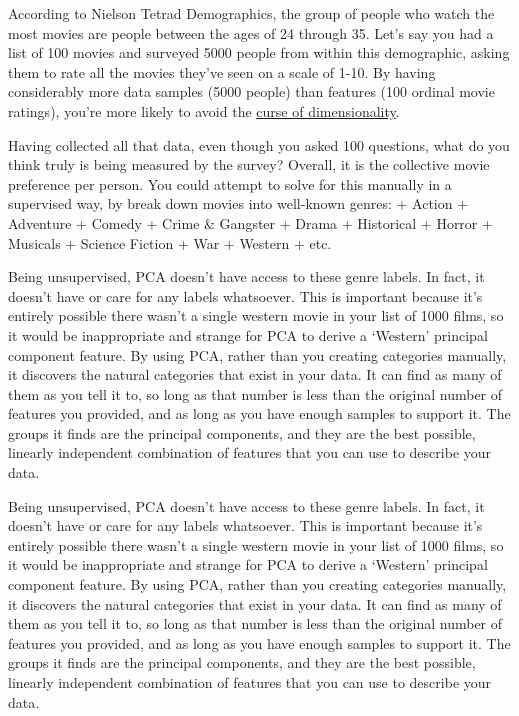 \documentclass[11pt]{article}
\begin{document}
According to Nielson Tetrad Demographics, the group of people who watch
the most movies are people between the ages of 24 through 35. Let's say
you had a list of 100 movies and surveyed 5000 people from within this
demographic, asking them to rate all the movies they've seen on a scale
of 1-10. By having considerably more data samples (5000 people) than
features (100 ordinal movie ratings), you're more likely to avoid the
\href{https://en.wikipedia.org/wiki/Curse_of_dimensionality}{curse of
dimensionality}.

Having collected all that data, even though you asked 100 questions,
what do you think truly is being measured by the survey? Overall, it is
the collective movie preference per person. You could attempt to solve
for this manually in a supervised way, by break down movies into
well-known genres: + Action + Adventure + Comedy + Crime \& Gangster +
Drama + Historical + Horror + Musicals + Science Fiction + War + Western
+ etc.

Being unsupervised, PCA doesn't have access to these genre labels. In
fact, it doesn't have or care for any labels whatsoever. This is
important because it's entirely possible there wasn't a single western
movie in your list of 1000 films, so it would be inappropriate and
strange for PCA to derive a `Western' principal component feature. By
using PCA, rather than you creating categories manually, it discovers
the natural categories that exist in your data. It can find as many of
them as you tell it to, so long as that number is less than the original
number of features you provided, and as long as you have enough samples
to support it. The groups it finds are the principal components, and
they are the best possible, linearly independent combination of features
that you can use to describe your data.

Being unsupervised, PCA doesn't have access to these genre labels. In
fact, it doesn't have or care for any labels whatsoever. This is
important because it's entirely possible there wasn't a single western
movie in your list of 1000 films, so it would be inappropriate and
strange for PCA to derive a `Western' principal component feature. By
using PCA, rather than you creating categories manually, it discovers
the natural categories that exist in your data. It can find as many of
them as you tell it to, so long as that number is less than the original
number of features you provided, and as long as you have enough samples
to support it. The groups it finds are the principal components, and
they are the best possible, linearly independent combination of features
that you can use to describe your data.
\end{document}
